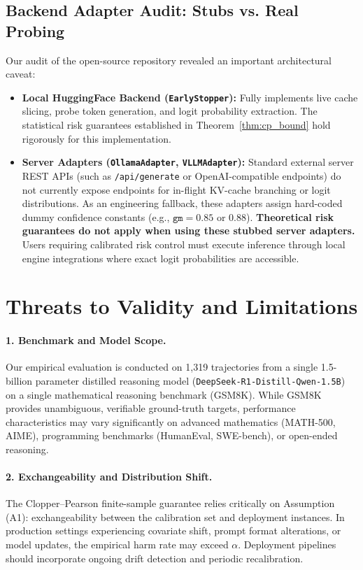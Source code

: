 \documentclass[11pt]{article}
\begin{document}
\subsection{Backend Adapter Audit: Stubs vs. Real Probing}
Our audit of the open-source repository revealed an important architectural caveat:
\begin{itemize}
  \item \textbf{Local HuggingFace Backend (\texttt{EarlyStopper}):} Fully implements live cache slicing, probe token generation, and logit probability extraction. The statistical risk guarantees established in Theorem~\ref{thm:cp_bound} hold rigorously for this implementation.
  \item \textbf{Server Adapters (\texttt{OllamaAdapter}, \texttt{VLLMAdapter}):} Standard external server REST APIs (such as \texttt{/api/generate} or OpenAI-compatible endpoints) do not currently expose endpoints for in-flight KV-cache branching or logit distributions. As an engineering fallback, these adapters assign hard-coded dummy confidence constants (e.g., $\texttt{gm}=0.85$ or $0.88$). \textbf{Theoretical risk guarantees do not apply when using these stubbed server adapters.} Users requiring calibrated risk control must execute inference through local engine integrations where exact logit probabilities are accessible.
\end{itemize}

\section{Threats to Validity and Limitations}
\label{sec:limitations}

\paragraph{1. Benchmark and Model Scope.}
Our empirical evaluation is conducted on 1{,}319 trajectories from a single 1.5-billion parameter distilled reasoning model (\texttt{DeepSeek-R1-Distill-Qwen-1.5B}) on a single mathematical reasoning benchmark (GSM8K). While GSM8K provides unambiguous, verifiable ground-truth targets, performance characteristics may vary significantly on advanced mathematics (MATH-500, AIME), programming benchmarks (HumanEval, SWE-bench), or open-ended reasoning.

\paragraph{2. Exchangeability and Distribution Shift.}
The Clopper--Pearson finite-sample guarantee relies critically on Assumption (A1): exchangeability between the calibration set and deployment instances. In production settings experiencing covariate shift, prompt format alterations, or model updates, the empirical harm rate may exceed $\alpha$. Deployment pipelines should incorporate ongoing drift detection and periodic recalibration.
\end{document}
